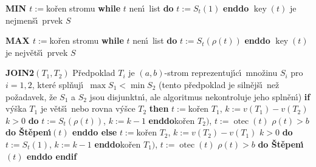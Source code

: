 \documentclass[a4paper,12pt]{article}
\DeclareMathOperator*{\otec}{otec}
\DeclareMathOperator*{\key}{key}
\begin{document}
{\bf MIN\newline 
$t:=$}ko\v ren stromu\newline 
{\bf while} $t$ nen\'\i\ list {\bf do} $t:=S_t(1)$ {\bf enddo}\newline 
$\key(t)$ je nejmen\v s\'\i\ prvek $S$
\medskip

{\bf MAX\newline 
$t:=$}ko\v ren stromu\newline 
{\bf while} $t$ nen\'\i\ list {\bf do} $t:=S_t(\rho (t))$ {\bf enddo}\newline 
$\key(t)$ je nejv\v et\v s\'\i\ prvek $S$
\medskip

{\bf JOIN2$(T_1,T_2)$}\newline
P\v redpoklad $T_i$ je $(a,b)$-strom reprezentuj\'\i c\'\i\ 
mno\v zinu $S_i$ pro $i=1,2$, kter\'e spl\v nuj\'\i\ $\max S_1<\min 
S_2$ 
(tento p\v redpoklad je siln\v ej\v s\'\i\ ne\v z po\v zadavek, \v ze $
S_1$ a 
$S_2$ jsou disjunktn\'\i , ale algoritmus nekontroluje jeho spln\v en\'\i )\newline 
{\bf if} v\'y\v ska $T_1$ je v\v et\v s\'\i\ nebo rovna v\'y\v sce $T_2$ {\bf then}\newline 
\phantom{---}$t:=$ko\v ren $T_1$, $k:=v(T_1)-v(T_2)$\newline 
\phantom{---}{\bf while} $k>0$ {\bf do} $t:=S_t(\rho (t))$, $k:=k-1$ {\bf enddo}\newline \phantom{---}{\bf Spojen\'\i$(t,$}ko\v ren $T_2)$, $t:=\otec(t)$\newline 
\phantom{---}{\bf while} $\rho (t)>b$ {\bf do \v St\v epen\'\i$(t)$ enddo\newline 
else}\newline 
\phantom{---}$t:=$ko\v ren $T_2$, $k:=v(T_2)-v(T_1)$ \newline 
\phantom{---}{\bf while} $k>0$ {\bf do} $t:=S_t(1)$, $k:=k-1$ {\bf enddo}\newline \phantom{---}{\bf Spojen\'\i$(t,$}ko\v ren $T_1)$, $t:=\otec(t)$\newline 
\phantom{---}{\bf while} $\rho (t)>b$ {\bf do \v St\v epen\'\i$(t)$ enddo\newline 
endif}
\medskip
\end{document}
